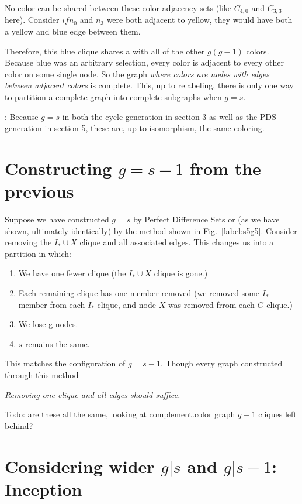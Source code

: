 \documentclass[11pt, oneside]{article} 	%
\begin{document}
No color can be shared between these color adjacency sets (like $C_{4,0}$ and $C_{3,3}$ here).  Consider $if n_0$ and $n_3$ were both adjacent to yellow, they would have both a yellow and blue edge between them.

Therefore, this blue clique shares a with all of the other $g(g-1)$ colors.  Because blue was an arbitrary selection, every color is adjacent to every other color on some single node.
So the graph \emph{where colors are nodes with edges between adjacent colors} is complete. This, up to relabeling, there is only one way to partition a complete graph into complete subgraphs when $g=s$.

: Because $g=s$ in both the cycle generation in section 3 as well as the PDS generation in section 5, these are, up to isomorphism, the same coloring.



\section{Constructing $g=s-1$ from the previous}

Suppose we have constructed $g=s$ by Perfect Difference Sets or (as we have shown, ultimately identically) by the method shown in Fig.~\ref{label:s5g5}. Consider removing the $I_* \cup X$ clique and all associated edges. This changes us into a partition in which:
 
\begin{enumerate}
\item We have one fewer clique (the $I_* \cup X$ clique is gone.)
\item Each remaining clique has one member removed (we removed some $I_*$ member from each $I_*$ clique, and node $X$ was removed frrom each $G$ clique.)
\item We lose g nodes.
\item $s$ remains the same.
\end{enumerate}

This matches the configuration of $g=s-1$. Though every graph constructed through this method 

\emph{Removing one clique and all edges should suffice.}

Todo: are these all the same, looking at complement.color graph $g-1$ cliques left behind?



\section{Considering wider $g | s$ and $g | s-1$: Inception}
\end{document}
